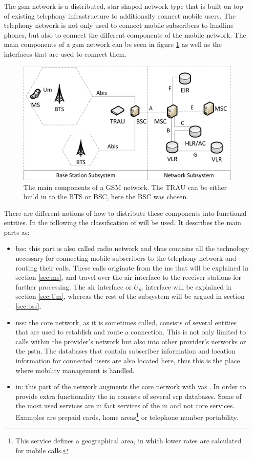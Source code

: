 The \gls{gsm} network is a distributed, star shaped network type that is built on top of existing telephony infrastructure to additionally connect mobile users.
The telephony network is not only used to connect mobile subscribers to landline phones, but also to connect the different components of the mobile network.
The main components of a \gls{gsm} network can be seen in figure \ref{fig:gsm_network} as well as the interfaces that are used to connect them.
\begin{figure}
\centering
\includegraphics{../Images/Architecture}
\caption{The main components of a GSM network. The TRAU can be either build in to the BTS or BSC, here the BSC was chosen.}
\label{fig:gsm_network}
\end{figure}
There are different notions of how to distribute these components into functional entities.
In the following the classification of \cite{kommsys2006} will be used.
It describes the main parts as:
\begin{itemize}
	\item \gls{bss}: this part is also called radio network and thus contains all the technology necessary for connecting mobile subscribers to the telephony network and routing their calls. 
	These calls originate from the \gls{ms} that will be explained in section \ref{sec:ms}, and travel over the air interface to the receiver stations for further processing.
	The air interface or $U_m$ interface will be explained in section \ref{sec:Um}, whereas the rest of the subsystem will be argued in section \ref{sec:bss}.
	\item \gls{nss}: the core network, as it is sometimes called, consists of several entities that are used to establish and route a connection.
	This is not only limited to calls within the provider's network but also into other provider's networks or the \gls{pstn}.
	The databases that contain subscriber information and location information for connected users are also located here, thus this is the place where mobility management is handled.
	\item \gls{in}: this part of the network augments the core network with \gls{vas} \cite{ITU1200}.
	In order to provide extra functionality the \gls{in} consists of several \gls{scp} databases.
	Some of the most used services are in fact services of the \gls{in} and not core services.
	Examples are prepaid cards, home areas\footnote{This service defines a geographical area, in which lower rates are calculated for mobile calls.} or telephone number portability.
\end{itemize}
